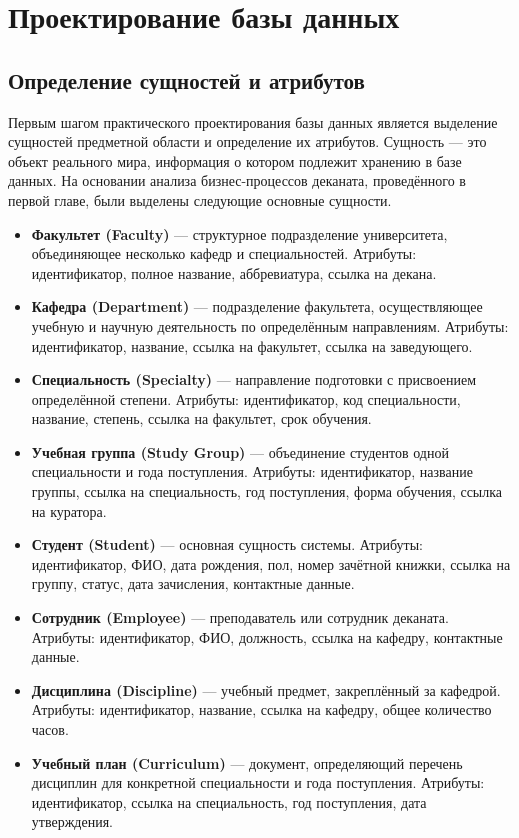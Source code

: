 \documentclass[14pt, a4paper]{extreport}
\begin{document}
\section{Проектирование базы данных}

\subsection{Определение сущностей и атрибутов}
Первым шагом практического проектирования базы данных является выделение сущностей предметной области и определение их атрибутов. Сущность --- это объект реального мира, информация о котором подлежит хранению в базе данных. На основании анализа бизнес-процессов деканата, проведённого в первой главе, были выделены следующие основные сущности.

\begin{itemize}
    \item \textbf{Факультет (Faculty)} --- структурное подразделение университета, объединяющее несколько кафедр и специальностей. Атрибуты: идентификатор, полное название, аббревиатура, ссылка на декана.
    \item \textbf{Кафедра (Department)} --- подразделение факультета, осуществляющее учебную и научную деятельность по определённым направлениям. Атрибуты: идентификатор, название, ссылка на факультет, ссылка на заведующего.
    \item \textbf{Специальность (Specialty)} --- направление подготовки с присвоением определённой степени. Атрибуты: идентификатор, код специальности, название, степень, ссылка на факультет, срок обучения.
    \item \textbf{Учебная группа (Study Group)} --- объединение студентов одной специальности и года поступления. Атрибуты: идентификатор, название группы, ссылка на специальность, год поступления, форма обучения, ссылка на куратора.
    \item \textbf{Студент (Student)} --- основная сущность системы. Атрибуты: идентификатор, ФИО, дата рождения, пол, номер зачётной книжки, ссылка на группу, статус, дата зачисления, контактные данные.
    \item \textbf{Сотрудник (Employee)} --- преподаватель или сотрудник деканата. Атрибуты: идентификатор, ФИО, должность, ссылка на кафедру, контактные данные.
    \item \textbf{Дисциплина (Discipline)} --- учебный предмет, закреплённый за кафедрой. Атрибуты: идентификатор, название, ссылка на кафедру, общее количество часов.
    \item \textbf{Учебный план (Curriculum)} --- документ, определяющий перечень дисциплин для конкретной специальности и года поступления. Атрибуты: идентификатор, ссылка на специальность, год поступления, дата утверждения.

\end{itemize}
\end{document}
